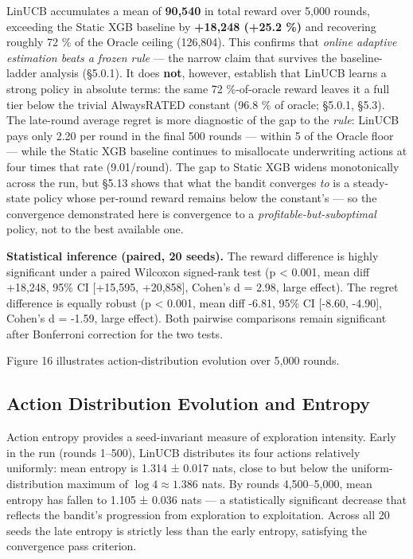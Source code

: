 LinUCB accumulates a mean of \textbf{90,540} in total reward over 5,000 rounds, exceeding the Static XGB baseline by \textbf{+18,248 (+25.2 \%)} and recovering roughly 72 \% of the Oracle ceiling (126,804). This confirms that \emph{online adaptive estimation beats a frozen rule} --- the narrow claim that survives the baseline-ladder analysis (§5.0.1). It does \textbf{not}, however, establish that LinUCB learns a strong policy in absolute terms: the same 72 \%-of-oracle reward leaves it a full tier below the trivial AlwaysRATED constant (96.8 \% of oracle; §5.0.1, §5.3). The late-round average regret is more diagnostic of the gap to the \emph{rule}: LinUCB pays only 2.20 per round in the final 500 rounds --- within 5 of the Oracle floor --- while the Static XGB baseline continues to misallocate underwriting actions at four times that rate (9.01/round). The gap to Static XGB widens monotonically across the run, but §5.13 shows that what the bandit converges \emph{to} is a steady-state policy whose per-round reward remains below the constant's --- so the convergence demonstrated here is convergence to a \emph{profitable-but-suboptimal} policy, not to the best available one.

\textbf{Statistical inference (paired, 20 seeds).} The reward difference is highly significant under a paired Wilcoxon signed-rank test (p \textless{} 0.001, mean diff +18,248, 95\% CI {[}+15,595, +20,858{]}, Cohen's d = 2.98, large effect). The regret difference is equally robust (p \textless{} 0.001, mean diff -6.81, 95\% CI {[}-8.60, -4.90{]}, Cohen's d = -1.59, large effect). Both pairwise comparisons remain significant after Bonferroni correction for the two tests.

Figure 16 illustrates action-distribution evolution over 5,000 rounds.


\subsection{Action Distribution Evolution and Entropy}\label{action-distribution-evolution-and-entropy}

Action entropy provides a seed-invariant measure of exploration intensity. Early in the run (rounds 1--500), LinUCB distributes its four actions relatively uniformly: mean entropy is 1.314 ± 0.017 nats, close to but below the uniform-distribution maximum of \(\log 4 ≈ 1.386\) nats. By rounds 4,500--5,000, mean entropy has fallen to 1.105 ± 0.036 nats --- a statistically significant decrease that reflects the bandit's progression from exploration to exploitation. Across all 20 seeds the late entropy is strictly less than the early entropy, satisfying the convergence pass criterion.

